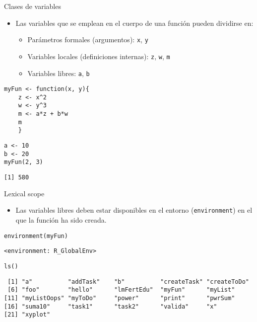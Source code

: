 \documentclass[xcolor={usenames,svgnames,dvipsnames}]{beamer}
\begin{document}
\begin{frame}[fragile,label=sec-2-1]{Clases de variables}
 \begin{itemize}
\item Las variables que se emplean en el cuerpo de una función pueden
dividirse en:
\begin{itemize}
\item Parámetros formales (argumentos): \texttt{x}, \texttt{y}
\item Variables locales (definiciones internas): \texttt{z}, \texttt{w}, \texttt{m}
\item Variables libres: \texttt{a}, \texttt{b}
\end{itemize}
\end{itemize}
\lstset{language=R,numbers=none}
\begin{lstlisting}
myFun <- function(x, y){
    z <- x^2
    w <- y^3
    m <- a*z + b*w
    m
    }
\end{lstlisting}

\lstset{language=R,numbers=none}
\begin{lstlisting}
a <- 10
b <- 20
myFun(2, 3)
\end{lstlisting}

\begin{verbatim}
[1] 580
\end{verbatim}
\end{frame}
\begin{frame}[fragile,label=sec-2-2]{Lexical scope}
 \begin{itemize}
\item Las variables libres deben estar disponibles en el entorno
(\texttt{environment}) en el que la función ha sido creada.
\end{itemize}
\lstset{language=R,numbers=none}
\begin{lstlisting}
environment(myFun)
\end{lstlisting}

\begin{verbatim}
<environment: R_GlobalEnv>
\end{verbatim}

\lstset{language=R,numbers=none}
\begin{lstlisting}
ls()
\end{lstlisting}

\begin{verbatim}
 [1] "a"          "addTask"    "b"          "createTask" "createToDo"
 [6] "foo"        "hello"      "lmFertEdu"  "myFun"      "myList"    
[11] "myListOops" "myToDo"     "power"      "print"      "pwrSum"    
[16] "suma10"     "task1"      "task2"      "valida"     "x"         
[21] "xyplot"
\end{verbatim}
\end{frame}
\end{document}
